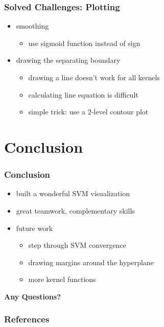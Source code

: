 \documentclass[english,hangout]{beamer}
\begin{document}
\begin{frame}
	\frametitle{Solved Challenges: Plotting}
  \begin{itemize}
  \item smoothing
    \begin{itemize}
    \item use sigmoid function instead of sign
    \end{itemize}
  \item drawing the separating boundary
    \begin{itemize}
    \item drawing a line doesn't work for all kernels
    \item calculating line equation is difficult
    \item simple trick: use a 2-level contour plot
    \end{itemize}
  \end{itemize}
\end{frame}


\section{Conclusion}
\begin{frame}
	\frametitle{Conclusion}

  \begin{itemize}
  \item built a wonderful SVM visualization
  \item great teamwork, complementary skills
  \item future work
    \begin{itemize}
    \item step through SVM convergence
    \item drawing margins around the hyperplane
    \item more kernel functions
    \end{itemize}
  \end{itemize}
  
\end{frame}

\begin{frame}[plain]
	\begin{center}
		\textbf{Any Questions?}
	\end{center}
\end{frame}

\begin{frame}
	\frametitle{References}
	
\end{frame}
\end{document}
